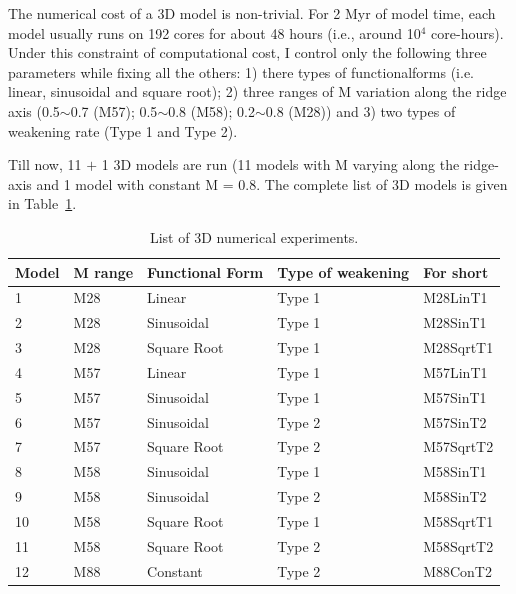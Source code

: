 The numerical cost of a 3D model is non-trivial. For 2 Myr of model time, each model usually runs on 192 cores for about 48 hours (i.e., around 10$^{4}$ core-hours). %
Under this constraint of computational cost, I control only the following three parameters while fixing all the others: 1) there types of functionalforms (i.e. linear, sinusoidal and square root); 2) three ranges of M variation along the ridge axis (0.5$\sim$0.7 (M57); 0.5$\sim$0.8 (M58); 0.2$\sim$0.8 (M28)) and 3) two types of weakening rate (Type 1 and Type 2).

Till now, 11 $+$ 1 3D models are run (11 models with M varying along the ridge-axis and 1 model with constant M = 0.8. The complete list of 3D models is given in Table~\hyperref[Tab1_1]{\ref{Tab1_1}}. 

\begin{table}[h]
\centering
\begin{tabular}{l l l l l}
\hline
\hline
Model& M range & Functional Form & Type of weakening & For short \\ 
\hline
1    &  M28    &   Linear        & Type 1   &  M28LinT1\\
\hline
2    &  M28    &   Sinusoidal    & Type 1   &  M28SinT1\\
\hline
3    &  M28    &   Square Root   & Type 1   &  M28SqrtT1 \\
\hline
4    &  M57    &   Linear        & Type 1   &  M57LinT1 \\
\hline
5    &  M57    &   Sinusoidal    & Type 1   &  M57SinT1 \\
\hline
6    &  M57    &   Sinusoidal    & Type 2   &  M57SinT2 \\
\hline
7    &  M57    &   Square Root   & Type 2   &  M57SqrtT2  \\
\hline
8    &  M58    &   Sinusoidal    & Type 1   &  M58SinT1  \\
\hline
9    &  M58    &   Sinusoidal    & Type 2   &  M58SinT2   \\
\hline
10   &  M58    &   Square Root   & Type 1   &  M58SqrtT1   \\
\hline
11   &  M58    &   Square Root   & Type 2   &  M58SqrtT2   \\
\hline
12   &  M88    &   Constant      & Type 2   &  M88ConT2 \\
\hline
\hline
\end{tabular}
\caption{List of 3D numerical experiments.}
\label{Tab1_1}
\end{table}




